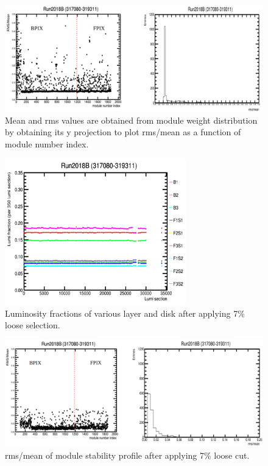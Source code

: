 \begin{figure}[!htp]
\centering
\includegraphics[width=1\textwidth]{ashish_thesis/rms_mean_all_modules_B.png}
\caption{%
   Mean and rms values are obtained from module weight distribution by obtaining its y projection to plot rms/mean as a function of module number index.
}
\label{fig:rms_mean_B}
\end{figure}




\begin{figure}[!htp]
\centering
\includegraphics[width=0.7\textwidth]{ashish_thesis/first_iteration_stability.png}
\caption{%
   Luminosity fractions of various layer and disk after applying 7\% loose selection.
}
\label{fig:f_it_stability}
\end{figure}

\begin{figure}[!htp]
\centering
\includegraphics[width=1\textwidth]{ashish_thesis/remaining_second_iteration.png}
\caption{%
 rms/mean of module stability profile after applying 7\% loose cut.
}
\label{fig:sec_it_remain}
\end{figure}




